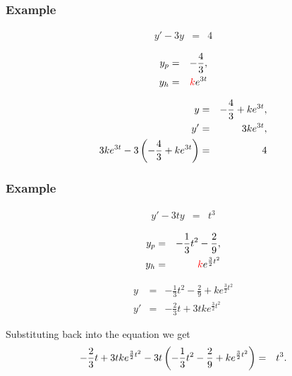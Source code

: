 \begin{frame}
  \frametitle{Example}

  \begin{eqnarray*}
    y' - 3y & = & 4
  \end{eqnarray*}

  \begin{eqnarray*}
    y_p & = & -\frac{4}{3}, \\
    y_h & = & {\color{red}k} e^{3t}
  \end{eqnarray*}

  \begin{eqnarray*}
    y & = & -\frac{4}{3} + k e^{3t}, \\
    y' & = & 3 k e^{3t}, \\
    3 k e^{3t} - 3 \left( -\frac{4}{3} + k e^{3t} \right) & = & 4
  \end{eqnarray*}


\end{frame}


\begin{frame}
  \frametitle{Example}

  \begin{eqnarray*}
    y' - 3ty & = & t^3
  \end{eqnarray*}

  \begin{eqnarray*}
    y_p & = & -\frac{1}{3} t^2 - \frac{2}{9}, \\
    y_h & = & {\color{red}k} e^{\frac{3}{2}t^2}
  \end{eqnarray*}

  \begin{eqnarray*}
    y & = & -\frac{1}{3} t^2 - \frac{2}{9} + k e^{\frac{3}{2}t^2} \\
    y' & = & -\frac{2}{3} t + 3t k e^{\frac{3}{2}t^2}
  \end{eqnarray*}

  Substituting back into the equation we get
  \begin{eqnarray*}
    -\frac{2}{3} t + 3t k e^{\frac{3}{2}t^2} - 3t \left( -\frac{1}{3} t^2 - \frac{2}{9} + k e^{\frac{3}{2}t^2} \right) & = & t^3.
  \end{eqnarray*}

\end{frame}


